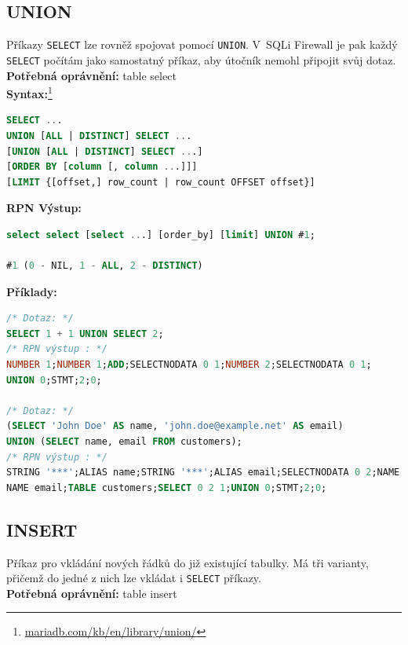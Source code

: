 \subsection{UNION} \label{subsec:6:union}
Příkazy \texttt{SELECT} lze rovněž spojovat pomocí \texttt{UNION}. V~SQLi Firewall je pak
každý \texttt{SELECT} počítám jako samostatný příkaz, aby útočník nemohl připojit svůj dotaz. \\

\textbf{Potřebná oprávnění:} table select \\

\textbf{Syntax:}\footnote{\url{mariadb.com/kb/en/library/union/}}
\begin{lstlisting}[language=sql]
SELECT ...
UNION [ALL | DISTINCT] SELECT ...
[UNION [ALL | DISTINCT] SELECT ...]
[ORDER BY [column [, column ...]]]
[LIMIT {[offset,] row_count | row_count OFFSET offset}]
\end{lstlisting}
\vspace*{\baselineskip}
\textbf{RPN Výstup:}
\begin{lstlisting}[language=sql]
select select [select ...] [order_by] [limit] UNION #1;

#1 (0 - NIL, 1 - ALL, 2 - DISTINCT)
\end{lstlisting}
\vspace*{\baselineskip}
\textbf{Příklady:}
\begin{lstlisting}[language=sql]
/* Dotaz: */
SELECT 1 + 1 UNION SELECT 2;
/* RPN výstup : */
NUMBER 1;NUMBER 1;ADD;SELECTNODATA 0 1;NUMBER 2;SELECTNODATA 0 1;
UNION 0;STMT;2;0;

/* Dotaz: */
(SELECT 'John Doe' AS name, 'john.doe@example.net' AS email) 
UNION (SELECT name, email FROM customers);
/* RPN výstup : */
STRING '***';ALIAS name;STRING '***';ALIAS email;SELECTNODATA 0 2;NAME name;
NAME email;TABLE customers;SELECT 0 2 1;UNION 0;STMT;2;0;
\end{lstlisting}

\subsection{INSERT} \label{subsec:6:insert}
Příkaz pro vkládání nových řádků do již existující tabulky. Má tři varianty, přičemž do jedné z nich lze vkládat i \texttt{SELECT}
příkazy. \\

\textbf{Potřebná oprávnění:} table insert \\

